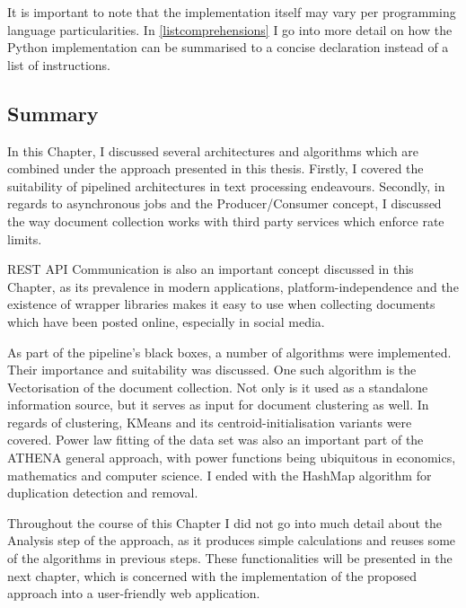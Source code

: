 It is important to note that the implementation itself may vary per programming language particularities. In \ref{listcomprehensions} I go into more detail on how the Python implementation can be summarised to a concise declaration instead of a list of instructions.

\subsection*{Summary}
In this Chapter, I discussed several architectures and algorithms which are combined under the approach presented in this thesis. Firstly, I covered the suitability of pipelined architectures in text processing endeavours. Secondly, in regards to asynchronous jobs and the Producer/Consumer concept, I discussed the way document collection works with third party services which enforce rate limits.

REST API Communication is also an important concept discussed in this Chapter, as its prevalence in modern applications, platform-independence and the existence of wrapper libraries makes it easy to use when collecting documents which have been posted online, especially in social media.

As part of the pipeline's black boxes, a number of algorithms were implemented. Their importance and suitability was discussed. One such algorithm is the Vectorisation of the document collection. Not only is it used as a standalone information source, but it serves as input for document clustering as well. In regards of clustering, KMeans and its centroid-initialisation variants were covered. Power law fitting of the data set was also an important part of the ATHENA general approach, with power functions being ubiquitous in economics, mathematics and computer science. I ended with the HashMap algorithm for duplication detection and removal.

Throughout the course of this Chapter I did not go into much detail about the Analysis step of the approach, as it produces simple calculations and reuses some of the algorithms in previous steps. These functionalities will be presented in the next chapter, which is concerned with the implementation of the proposed approach into a user-friendly web application.